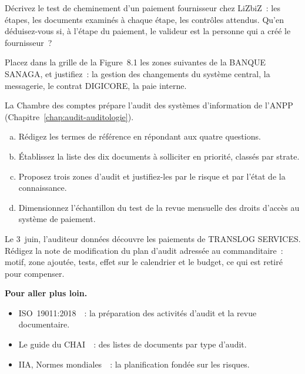 \begin{boxexo}[title={\ding{45}\quad Exercice~8.7. Un cheminement \niveaumoyen}]
Décrivez le test de cheminement d'un paiement fournisseur chez LiZbiZ~:
les étapes, les documents examinés à chaque étape, les contrôles attendus.
Qu'en déduisez-vous si, à l'étape du paiement, le valideur est la personne
qui a créé le fournisseur~?
\end{boxexo}

\begin{boxexo}[title={\ding{45}\quad Exercice~8.8. Placer les zones \niveaumoyen}]
Placez dans la grille de la Figure~8.1 les zones suivantes de la BANQUE
SANAGA, et justifiez~: la gestion des changements du système central, la
messagerie, le contrat DIGICORE, la paie interne.
\end{boxexo}

\begin{boxexo}[title={\ding{45}\quad Exercice~8.9. Le plan d'audit de l'ANPP \niveauexpert}]
La Chambre des comptes prépare l'audit des systèmes d'information de l'ANPP
(Chapitre~\ref{chap:audit-auditologie}).
\begin{enumerate}[(a)]
    \item Rédigez les termes de référence en répondant aux quatre questions.
    \item Établissez la liste des dix documents à solliciter en priorité,
          classés par strate.
    \item Proposez trois zones d'audit et justifiez-les par le risque et par
          l'état de la connaissance.
    \item Dimensionnez l'échantillon du test de la revue mensuelle des droits
          d'accès au système de paiement.
\end{enumerate}
\end{boxexo}

\begin{boxexo}[title={\ding{45}\quad Exercice~8.10. Modifier le plan \niveauexpert}]
Le 3~juin, l'auditeur données découvre les paiements de TRANSLOG SERVICES.
Rédigez la note de modification du plan d'audit adressée au commanditaire~:
motif, zone ajoutée, tests, effet sur le calendrier et le budget, ce qui est
retiré pour compenser.
\end{boxexo}

\bigskip

\begin{boxinfo}
\textbf{Pour aller plus loin.}
\begin{itemize}
    \item ISO~19011:2018~\cite{iso19011_2018}~: la préparation des
          activités d'audit et la revue documentaire.
    \item Le guide du CHAI~\cite{chai2014guide}~: des listes de documents
          par type d'audit.
    \item IIA, Normes mondiales~\cite{iia2024gias}~: la planification
          fondée sur les risques.
\end{itemize}
\end{boxinfo}

